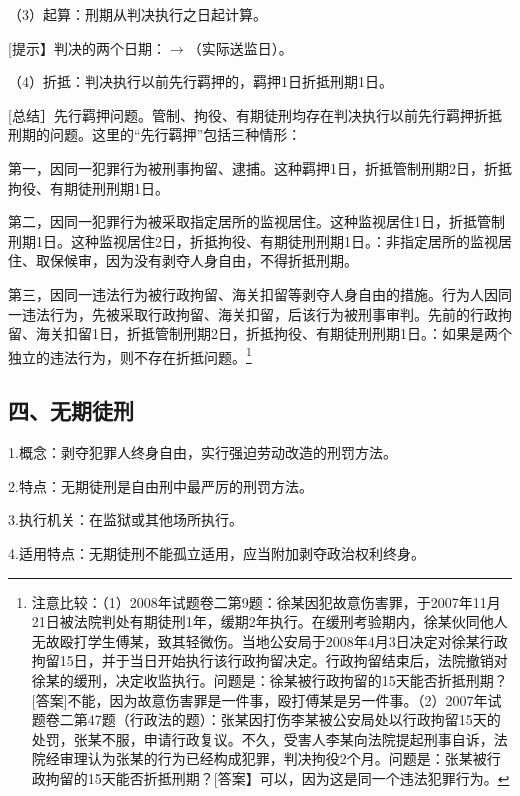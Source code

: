 （3）起算：刑期从判决执行之日起计算。

[提示】判决的两个日期：\ensuremath{\rightarrow}（实际送监日）。

（4）折抵：判决执行以前先行羁押的，羁押1日折抵刑期1日。

[总结］先行羁押问题。管制、拘役、有期徒刑均存在判决执行以前先行羁押折抵刑期的问题。这里的“先行羁押”包括三种情形：

第一，因同一犯罪行为被刑事拘留、逮捕。这种羁押1日，折抵管制刑期2日，折抵拘役、有期徒刑刑期1日。

第二，因同一犯罪行为被采取指定居所的监视居住。这种监视居住1日，折抵管制刑期1日。这种监视居住2日，折抵拘役、有期徒刑刑期1日。：非指定居所的监视居住、取保候审，因为没有剥夺人身自由，不得折抵刑期。

第三，因同一违法行为被行政拘留、海关扣留等剥夺人身自由的措施。行为人因同一违法行为，先被采取行政拘留、海关扣留，后该行为被刑事审判。先前的行政拘留、海关扣留1日，折抵管制刑期2日，折抵拘役、有期徒刑刑期1日。：如果是两个独立的违法行为，则不存在折抵问题。\footnote{注意比较：（1）2008年试题卷二第9题：徐某因犯故意伤害罪，于2007年11月21日被法院判处有期徒刑1年，缓期2年执行。在缓刑考验期内，徐某伙同他人无故殴打学生傅某，致其轻微伤。当地公安局于2008年4月3日决定对徐某行政拘留15日，并于当日开始执行该行政拘留决定。行政拘留结束后，法院撤销对徐某的缓刑，决定收监执行。问题是：徐某被行政拘留的15天能否折抵刑期？[答案]不能，因为故意伤害罪是一件事，殴打傅某是另一件事。（2）2007年试题卷二第47题（行政法的题）：张某因打伤李某被公安局处以行政拘留15天的处罚，张某不服，申请行政复议。不久，受害人李某向法院提起刑事自诉，法院经审理认为张某的行为已经构成犯罪，判决拘役2个月。问题是：张某被行政拘留的15天能否折抵刑期？[答案】可以，因为这是同一个违法犯罪行为。}

\subsection*{四、无期徒刑}

1.概念：剥夺犯罪人终身自由，实行强迫劳动改造的刑罚方法。

2.特点：无期徒刑是自由刑中最严厉的刑罚方法。

3.执行机关：在监狱或其他场所执行。

4.适用特点：无期徒刑不能孤立适用，应当附加剥夺政治权利终身。


